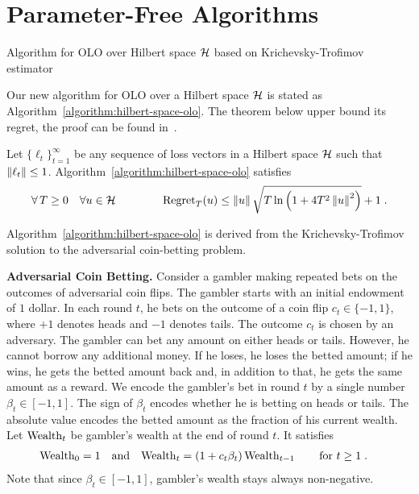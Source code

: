 \section{Parameter-Free Algorithms}
\label{section:algorithms}

\begin{algorithm}[t]
\caption{Algorithm for OLO over Hilbert space $\mathcal{H}$ based on Krichevsky-Trofimov estimator
\label{algorithm:hilbert-space-olo}}
\begin{algorithmic}[1]
{
\ENDFOR
}
\end{algorithmic}
\end{algorithm}

Our new algorithm for \ac{OLO} over a Hilbert space $\mathcal{H}$ is stated as
Algorithm~\ref{algorithm:hilbert-space-olo}.  The theorem below upper bound its
regret, the proof can be found in~\cite{Orabona-Pal-2016-parameter-free}.

\begin{theorem}
\label{theorem:hilbert-space-olo-regret}
Let $\{\ell_t\}_{t=1}^\infty$ be any sequence of loss vectors
in a Hilbert space $\mathcal{H}$ such that $\left\|{\ell_t}\right\| \le 1$.
Algorithm~\ref{algorithm:hilbert-space-olo} satisfies
$$
\forall \, T \ge 0 \quad
\forall u \in \mathcal{H} \qquad \qquad
\operatorname{Regret}_T(u) \le \left\|{u}\right\| \sqrt{T \ln\left(1 + 4T^2 \left\|{u}\right\|^2 \right)} + 1 \;.
$$
\end{theorem}

Algorithm~\ref{algorithm:hilbert-space-olo} is derived from the
Krichevsky-Trofimov solution to the adversarial coin-betting problem.

\textbf{Adversarial Coin Betting.}
Consider a gambler making repeated bets on the outcomes of adversarial coin
flips. The gambler starts with an initial endowment of $1$ dollar. In each
round $t$, he bets on the outcome of a coin flip $c_t \in \{-1,1\}$, where $+1$
denotes heads and $-1$ denotes tails.  The outcome $c_t$ is chosen by an
adversary.  The gambler can bet any amount on either heads or tails. However,
he cannot borrow any additional money. If he loses, he loses the betted amount;
if he wins, he gets the betted amount back and, in addition to that, he gets
the same amount as a reward.  We encode the gambler's bet in round $t$ by a
single number $\beta_t \in [-1,1]$. The sign of $\beta_t$ encodes whether he is
betting on heads or tails. The absolute value encodes the betted amount as the
fraction of his current wealth.  Let $\operatorname{Wealth}_t$ be gambler's wealth at the end
of round $t$. It satisfies
\begin{align}
\label{equation:wealth-recurrence}
\operatorname{Wealth}_0 & = 1 &
& \text{and} &
\operatorname{Wealth}_t & = (1 + c_t \beta_t) \operatorname{Wealth}_{t-1} \qquad \text{for $t \ge 1$} \; .
\end{align}
Note that since $\beta_t \in [-1,1]$, gambler's wealth stays always
non-negative.

